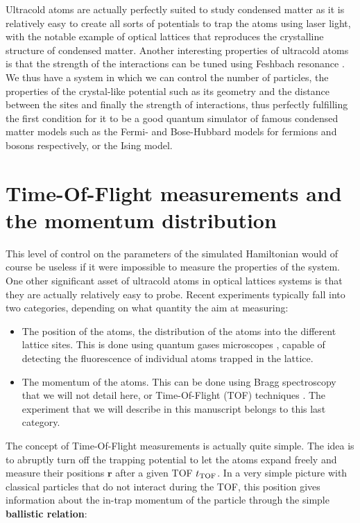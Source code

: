 Ultracold atoms are actually perfectly suited to study condensed matter as it is relatively easy to create all sorts of potentials to trap the atoms using laser light, with the notable example of optical lattices \cite{bloch2005ultracold} that reproduces the crystalline structure of condensed matter. Another interesting properties of ultracold atoms is that the strength of the interactions can be tuned using Feshbach resonance \cite{chin2010feshbach,feshbach1958unified}. We thus have a system in which we can control the number of particles, the properties of the crystal-like potential such as its geometry and the distance between the sites and finally the strength of interactions, thus perfectly fulfilling the first condition for it to be a good quantum simulator of famous condensed matter models such as the Fermi- and Bose-Hubbard models for fermions and bosons respectively, or the Ising model. 

\section*{Time-Of-Flight measurements and the momentum distribution}

This level of control on the parameters of the simulated Hamiltonian would of course be useless if it were impossible to measure the properties of the system. One other significant asset of ultracold atoms in optical lattices systems is that they are actually relatively easy to probe. Recent experiments typically fall into two categories, depending on what quantity the aim at measuring:

\begin{itemize}
 \item The position of the atoms, \ie the distribution of the atoms into the different lattice sites. This is done using quantum gases microscopes \cite{bakr2009quantum,cheuk2015quantum,sherson2010single}, capable of detecting the fluorescence of individual atoms trapped in the lattice.
 \item The momentum of the atoms. This can be done using Bragg spectroscopy \cite{stenger1999} that we will not detail here, or Time-Of-Flight (TOF) techniques \cite{greiner2002quantum,spielman2008condensate,xu2006}. The experiment that we will describe in this manuscript belongs to this last category.
\end{itemize}

The concept of Time-Of-Flight measurements is actually quite simple. The idea is to abruptly turn off the trapping potential to let the atoms expand freely and measure their positions $\bm{r}$ after a given TOF $t_{\rm{TOF}}$. In a very simple picture with classical particles that do not interact during the TOF, this position gives information about the in-trap momentum of the particle through the simple \textbf{ballistic relation}:

